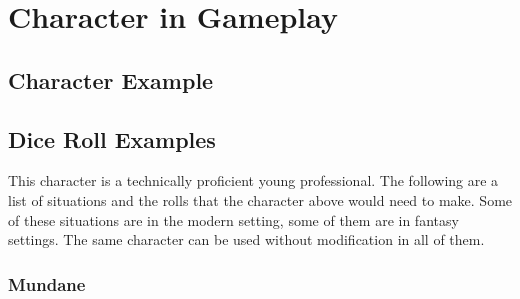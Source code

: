 

\section*{Character in Gameplay}

\subsection*{Character Example}




\subsection*{Dice Roll Examples}

This character is a technically proficient young professional.
The following are a list of situations and the rolls that the character above would need to make.
Some of these situations are in the modern setting, some of them are in fantasy settings. The same character can be used without modification in all of them.

\subsubsection*{Mundane}

